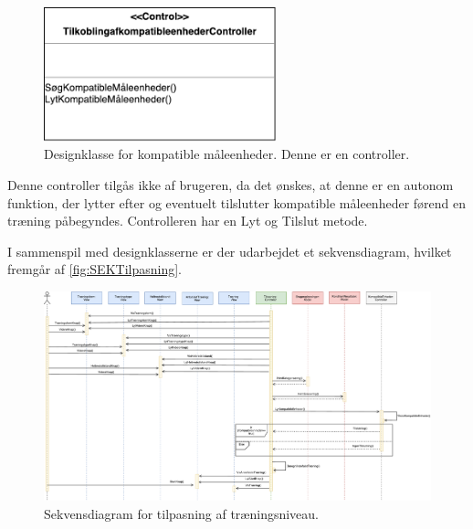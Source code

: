 \begin{figure} [H]
\centering
\includegraphics[width=0.6\textwidth]{figures/MVC/MVCKompMaale}
\caption{Designklasse for kompatible måleenheder. Denne er en controller.}
\label{fig:kompatiblemåleenheder}
\end{figure}

\noindent 
Denne controller tilgås ikke af brugeren, da det ønskes, at denne er en autonom funktion, der lytter efter og eventuelt tilslutter kompatible måleenheder førend en træning påbegyndes. Controlleren har en Lyt og Tilslut metode. 

I sammenspil med designklasserne er der udarbejdet et sekvensdiagram, hvilket fremgår af \autoref{fig:SEKTilpasning}. 

\begin{figure} [H]
\centering
\includegraphics[width=1\textwidth]{figures/Sek/SEKTilpasning}
\caption{Sekvensdiagram for tilpasning af træningsniveau.}
\label{fig:SEKTilpasning}
\end{figure}

